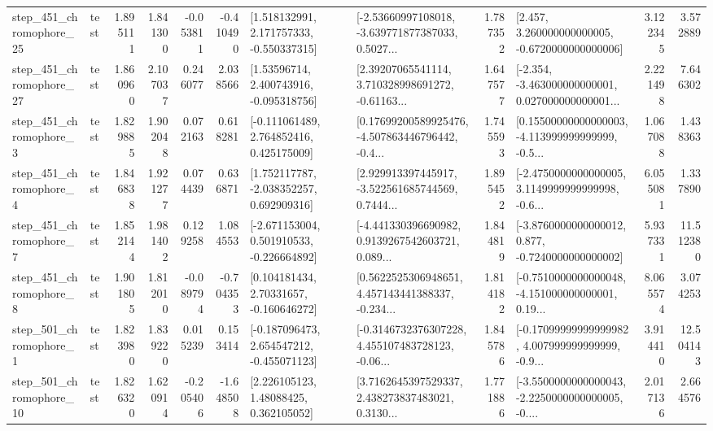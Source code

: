 \begin{tabular}{llrrrrllrlrr}
  step\_451\_chromophore\_25 &      test &      1.895111 &    1.841300 &     -0.053811 & -0.410490 &    [1.518132991, 2.171757333, -0.550337315] &  [-2.53660997108018, -3.639771877387033, 0.5027... &       1.787352 &    [2.457, 3.260000000000005, -0.6720000000000006] &            3.122345 &          3.572889 \\
  step\_451\_chromophore\_27 &      test &      1.860960 &    2.107037 &      0.246077 &  2.038566 &     [1.53596714, 2.400743916, -0.095318756] &  [2.39207065541114, 3.710328998691272, -0.61163... &       1.647577 &  [-2.354, -3.463000000000001, 0.027000000000001... &            2.221498 &          7.646302 \\
   step\_451\_chromophore\_3 &      test &      1.829885 &    1.902048 &      0.072163 &  0.618281 &    [-0.111061489, 2.764852416, 0.425175009] &  [0.17699200589925476, -4.507863446796442, -0.4... &       1.745593 &  [0.15500000000000003, -4.113999999999999, -0.5... &            1.067088 &          1.438363 \\
   step\_451\_chromophore\_4 &      test &      1.846838 &    1.921277 &      0.074439 &  0.636871 &    [1.752117787, -2.038352257, 0.692909316] &  [2.929913397445917, -3.522561685744569, 0.7444... &       1.895452 &  [-2.4750000000000005, 3.1149999999999998, -0.6... &            6.055081 &          1.337890 \\
   step\_451\_chromophore\_7 &      test &      1.852144 &    1.981402 &      0.129258 &  1.084553 &   [-2.671153004, 0.501910533, -0.226664892] &  [-4.441330396690982, 0.9139267542603721, 0.089... &       1.844819 &  [-3.8760000000000012, 0.877, -0.7240000000000002] &            5.937331 &         11.512380 \\
   step\_451\_chromophore\_8 &      test &      1.901805 &    1.812010 &     -0.089794 & -0.704353 &     [0.104181434, 2.70331657, -0.160646272] &  [0.5622525306948651, 4.457143441388337, -0.234... &       1.814182 &  [-0.7510000000000048, -4.151000000000001, 0.19... &            8.065574 &          3.074253 \\
   step\_501\_chromophore\_1 &      test &      1.823980 &    1.839220 &      0.015239 &  0.153414 &   [-0.187096473, 2.654547212, -0.455071123] &  [-0.3146732376307228, 4.455107483728123, -0.06... &       1.845786 &  [-0.17099999999999982, 4.007999999999999, -0.9... &            3.914410 &         12.504143 \\
  step\_501\_chromophore\_10 &      test &      1.826320 &    1.620914 &     -0.205406 & -1.648508 &      [2.226105123, 1.48088425, 0.362105052] &  [3.7162645397529337, 2.438273837483021, 0.3130... &       1.771886 &  [-3.5500000000000043, -2.2250000000000005, -0.... &            2.017136 &          2.664576 \\

\end{tabular}
